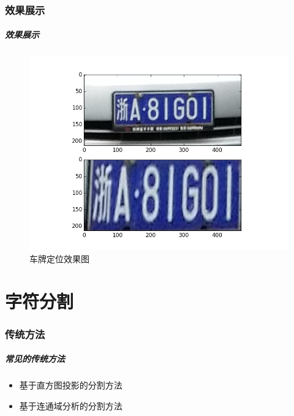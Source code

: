 \documentclass[UTF8]{beamer}
\begin{document}
\section{效果展示}

\begin{frame}
  \frametitle{效果展示}

  \begin{figure}[ht]
    \centering
    \includegraphics[width=1.0\linewidth]{./Figure/LocalizationDemo.png}
    \caption{车牌定位效果图}\label{Fig:LocalizationDemo}
  \end{figure}
\end{frame}

\part{字符分割}

\section{传统方法}

\begin{frame}
  \frametitle{常见的传统方法}
  
  \begin{itemize}
    \item 基于直方图投影的分割方法
    \item 基于连通域分析的分割方法
  \end{itemize}
\end{frame}
\end{document}
